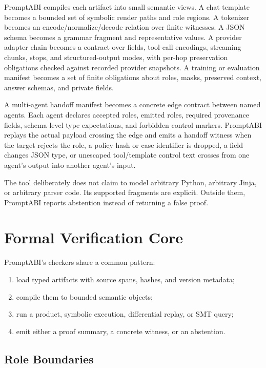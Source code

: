 \documentclass[10pt]{article}
\begin{document}
PromptABI compiles each artifact into small semantic views. A chat template
becomes a bounded set of symbolic render paths and role regions. A tokenizer
becomes an encode/normalize/decode relation over finite witnesses. A JSON
schema becomes a grammar fragment and representative values. A provider adapter chain becomes a contract over fields, tool-call encodings,
streaming chunks, stops, and structured-output modes, with per-hop preservation
obligations checked against recorded provider snapshots. A training or evaluation
manifest becomes a set of finite obligations about roles, masks, preserved
context, answer schemas, and private fields.

A multi-agent handoff manifest becomes a concrete edge contract between named
agents. Each agent declares accepted roles, emitted roles, required provenance
fields, schema-level type expectations, and forbidden control markers. PromptABI
replays the actual payload crossing the edge and emits a handoff witness when the
target rejects the role, a policy hash or case identifier is dropped, a field
changes JSON type, or unescaped tool/template control text crosses from one
agent's output into another agent's input.

The tool deliberately does not claim to model arbitrary Python, arbitrary
Jinja, or arbitrary parser code. Its supported fragments are explicit. Outside
them, PromptABI reports abstention instead of returning a false proof.

\section{Formal Verification Core}

PromptABI's checkers share a common pattern:
\begin{enumerate}
  \item load typed artifacts with source spans, hashes, and version metadata;
  \item compile them to bounded semantic objects;
  \item run a product, symbolic execution, differential replay, or SMT query;
  \item emit either a proof summary, a concrete witness, or an abstention.
\end{enumerate}

\subsection{Role Boundaries}
\end{document}
